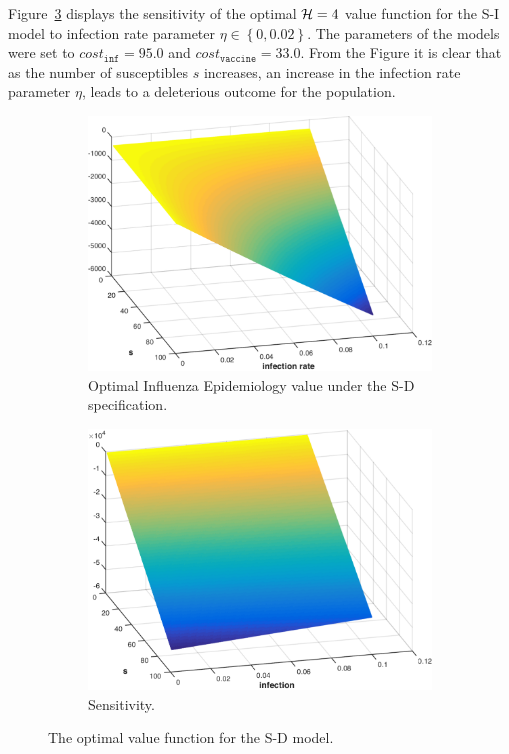 Figure~\ref{fig:influenza_sd} displays the sensitivity of the optimal {\footnotesize$ \mathcal{H} = 4 $} value function for the S-I model to infection rate parameter {\footnotesize $ \eta \in \left\lbrace 0, 0.02 \right\rbrace$}. The parameters of the models were set to {\footnotesize $cost_{\mathtt{inf}} = 95.0$} and {\footnotesize$cost_{\mathtt{vaccine}} = 33.0$}. From the Figure it is clear that as the number of susceptibles {\footnotesize $ s $} increases, an increase in the infection rate parameter {\footnotesize $ \eta $}, leads to a deleterious outcome for the population.
\begin{figure}[h!]
    \centering
    \begin{subfigure}[b]{0.4\textwidth}    
        \includegraphics[width=0.8\linewidth, height=0.6\linewidth]{images/sd_infection_s}
        \caption{Optimal Influenza Epidemiology value under the S-D specification.}
        \label{fig:influenza_sd_value_function}
        \vspace{1em}
    \end{subfigure}
    
    \begin{subfigure}[b]{0.4\textwidth}    
    \includegraphics[width=0.8\linewidth, height=0.6\linewidth]{images/sd_infection_sensitivity}
    \caption{Sensitivity.}
    \label{fig:influenza_sd_sensitivity}
    \end{subfigure}  
    \caption{The optimal value function for the S-D model.}
    \label{fig:influenza_sd}    
\end{figure}

